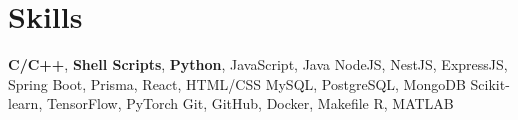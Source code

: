 \section{\textbf{Skills}}
\vspace{-0.4mm}
 \resumeHeadingSkillStart
    {\textbf{C/C++}, \textbf{Shell Scripts}, \textbf{Python}, JavaScript, Java}
    {NodeJS, NestJS, ExpressJS, Spring Boot, Prisma, React, HTML/CSS}
    {MySQL, PostgreSQL, MongoDB}
    {Scikit-learn, TensorFlow, PyTorch}
    {Git, GitHub, Docker, Makefile}
    {R, MATLAB}
 \resumeHeadingSkillEnd
 
\vspace{-6mm}
 
